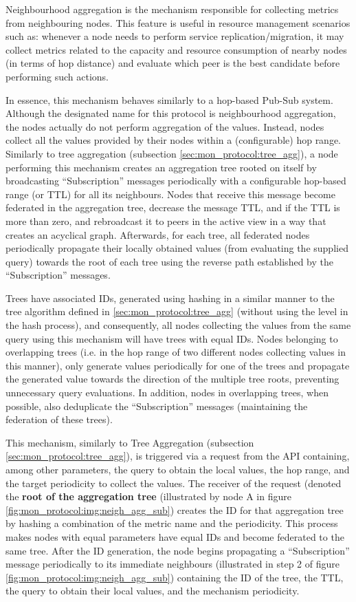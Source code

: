 Neighbourhood aggregation is the mechanism responsible for collecting metrics from neighbouring nodes. This feature is useful in resource management scenarios such as: whenever a node needs to perform service replication/migration, it may collect metrics related to the capacity and resource consumption of nearby nodes (in terms of hop distance) and evaluate which peer is the best candidate before performing such actions. 

In essence, this mechanism behaves similarly to a hop-based Pub-Sub system. Although the designated name for this protocol is neighbourhood aggregation, the nodes actually do not perform aggregation of the values. Instead, nodes collect all the values provided by their nodes within a (configurable) hop range. Similarly to tree aggregation (subsection \ref{sec:mon_protocol:tree_agg}), a node performing this mechanism creates an aggregation tree rooted on itself by broadcasting ``Subscription'' messages periodically with a configurable hop-based range (or TTL) for all its neighbours. Nodes that receive this message become federated in the aggregation tree, decrease the message TTL, and if the TTL is more than zero, and rebroadcast it to peers in the active view in a way that creates an acyclical graph. Afterwards, for each tree, all federated nodes periodically propagate their locally obtained values (from evaluating the supplied query) towards the root of each tree using the reverse path established by the ``Subscription'' messages. 

Trees have associated IDs, generated using hashing in a similar manner to the tree algorithm defined in \ref{sec:mon_protocol:tree_agg} (without using the level in the hash process), and consequently, all nodes collecting the values from the same query using this mechanism will have trees with equal IDs. Nodes belonging to overlapping trees (i.e. in the hop range of two different nodes collecting values in this manner), only generate values periodically for one of the trees and propagate the generated value towards the direction of the multiple tree roots, preventing unnecessary query evaluations. In addition, nodes in overlapping trees, when possible, also deduplicate the ``Subscription'' messages (maintaining the federation of these trees).

This mechanism, similarly to Tree Aggregation (subsection \ref{sec:mon_protocol:tree_agg}), is triggered via a request from the API containing, among other parameters, the query to obtain the local values, the hop range, and the target periodicity to collect the values. The receiver of the request (denoted the \textbf{root of the aggregation tree} (illustrated by node A in figure \ref{fig:mon_protocol:img:neigh_agg_sub}) creates the ID for that aggregation tree by hashing a combination of the metric name and the periodicity. This process makes nodes with equal parameters have equal IDs and become federated to the same tree. After the ID generation, the node begins propagating a ``Subscription'' message periodically to its immediate neighbours (illustrated in step 2 of figure \ref{fig:mon_protocol:img:neigh_agg_sub}) containing the ID of the tree, the TTL, the query to obtain their local values, and the mechanism periodicity. 

